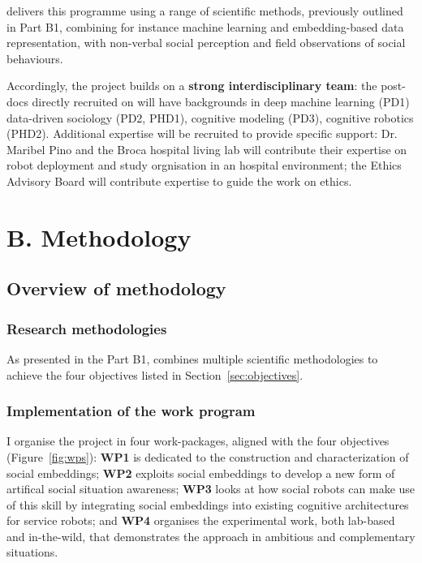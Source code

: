 \project delivers this programme using a range of scientific methods,
previously outlined in Part B1, combining for instance machine learning and
embedding-based data representation, with non-verbal social perception and field
observations of social behaviours.

Accordingly, the project builds on a \textbf{strong interdisciplinary team}: the
post-docs directly recruited on \project will have backgrounds in deep machine
learning (PD1) data-driven sociology (PD2, PHD1), cognitive modeling (PD3),
cognitive robotics (PHD2). Additional expertise will be recruited to provide
specific support: Dr. Maribel Pino and the Broca hospital living lab will
contribute their expertise on robot deployment and study orgnisation in an
hospital environment; the \project Ethics Advisory Board will contribute
expertise to guide the work on ethics.

\section{B. Methodology}

\subsection{Overview of \project methodology}

\subsubsection{Research methodologies}

As presented in the Part B1, \project combines multiple scientific
methodologies to achieve the four objectives listed in
Section~\ref{sec:objectives}.



\subsubsection{Implementation of the work program}

I organise the project in four work-packages, aligned with the four objectives
(Figure~\ref{fig:wps}): \textbf{WP1} is dedicated to the construction and
characterization of social embeddings; \textbf{WP2} exploits social embeddings
to develop a new form of artifical social situation awareness; \textbf{WP3} looks at how
social robots can make use of this skill by integrating social embeddings into
existing cognitive architectures for service robots; and \textbf{WP4} organises
the experimental work, both lab-based and in-the-wild, that demonstrates the
\project approach in ambitious and complementary situations.


